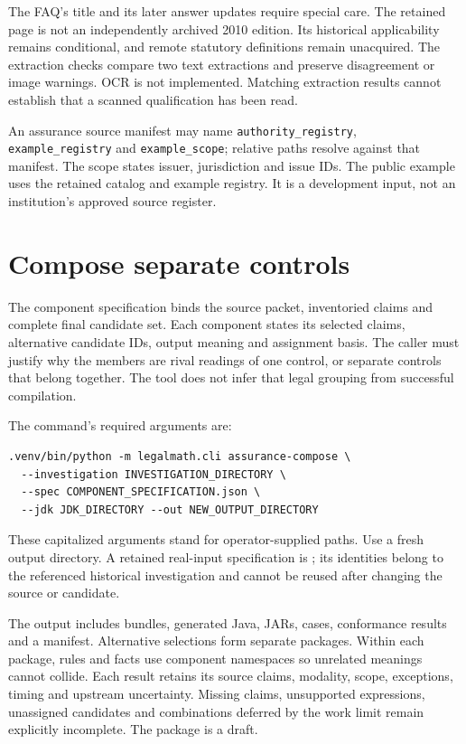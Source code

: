 \documentclass[12pt,a4paper,oneside,openany]{book}
\begin{document}
The FAQ's title and its later answer updates require special care. The retained
page is not an independently archived 2010 edition. Its historical applicability
remains conditional, and remote statutory definitions remain unacquired.
The extraction checks compare two text extractions and preserve disagreement
or image warnings. OCR is not implemented. Matching extraction results cannot
establish that a scanned qualification has been read.

An assurance source manifest may name \texttt{authority\_registry},
\texttt{example\_registry} and \texttt{example\_scope}; relative paths resolve
against that manifest. The scope states issuer, jurisdiction and issue IDs.
The public example
uses the retained catalog and example registry. It is a development input,
not an institution's approved source register.

\section{Compose separate controls}

The component specification binds the source packet, inventoried claims and
complete final candidate set. Each component states its selected claims,
alternative candidate IDs, output meaning and assignment basis. The caller
must justify why the members are rival readings of one control, or separate
controls that belong together. The tool does not infer that legal grouping
from successful compilation.

The command's required arguments are:
\begin{lstlisting}
.venv/bin/python -m legalmath.cli assurance-compose \
  --investigation INVESTIGATION_DIRECTORY \
  --spec COMPONENT_SPECIFICATION.json \
  --jdk JDK_DIRECTORY --out NEW_OUTPUT_DIRECTORY
\end{lstlisting}
These capitalized arguments stand for operator-supplied paths. Use a fresh
output directory. A retained real-input specification is
;
its identities belong to the referenced historical investigation and cannot
be reused after changing the source or candidate.

The output includes bundles, generated Java, JARs, cases, conformance results
and a manifest. Alternative selections form separate packages. Within each
package, rules and facts use component namespaces so unrelated meanings cannot
collide. Each result retains its source claims, modality, scope, exceptions,
timing and upstream uncertainty. Missing claims, unsupported expressions,
unassigned candidates and combinations deferred by the work limit remain
explicitly incomplete. The package is a draft.
\end{document}
